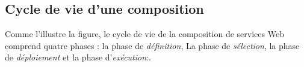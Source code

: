     \subsection{Cycle de vie d'une composition }
    \label{sec:cycle-de-vie+exigences}


    Comme l'illustre la figure, le cycle de vie de la composition de
    services Web comprend quatre phases \cite{sheng2014web}: la phase
    de \textit{définition}, La phase de \textit{sélection}, la phase
    de \textit{déploiement} et la phase d'\textit{exécution}:.

